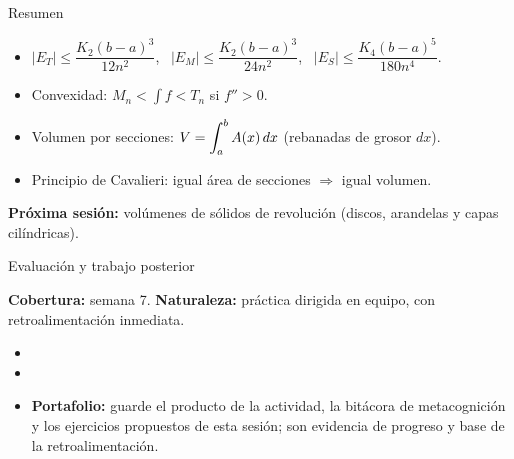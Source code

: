 \documentclass[10pt,aspectratio=169]{beamer}
\begin{document}
\begin{frame}{Resumen}
  \begin{itemize}
    \item $|E_T|\le\dfrac{K_2(b-a)^3}{12n^2}$, \ $|E_M|\le\dfrac{K_2(b-a)^3}{24n^2}$, \ $|E_S|\le\dfrac{K_4(b-a)^5}{180n^4}$.
    \item Convexidad: $M_n<\int f<T_n$ si $f''>0$.
    \item Volumen por secciones: $V=\displaystyle\int_a^bA(x)\,dx$ (rebanadas de grosor $dx$).
    \item Principio de Cavalieri: igual área de secciones $\Rightarrow$ igual volumen.
  \end{itemize}
  \vspace{3mm}
  \textbf{Próxima sesión:} volúmenes de sólidos de revolución (discos, arandelas y capas cilíndricas).
\end{frame}


\begin{frame}{Evaluación y trabajo posterior}
  \small
  \begin{evalbox}
    \textbf{Cobertura:} semana 7. \textbf{Naturaleza:} práctica dirigida en equipo, con retroalimentación inmediata.
  \end{evalbox}
  \begin{itemize}
    \item \criterios
    \item \declaracionia
    \item \textbf{Portafolio:} guarde el producto de la actividad, la bitácora de metacognición y los ejercicios propuestos de esta sesión; son evidencia de progreso y base de la retroalimentación.
  \end{itemize}
\end{frame}
\end{document}
